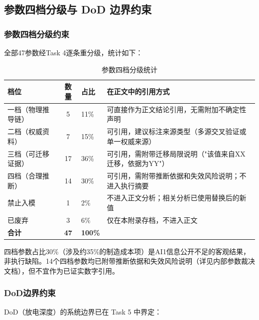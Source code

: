 \subsection{参数四档分级与 DoD 边界约束}
\label{sec:dod-boundary}

\subsubsection{参数四档分级约束}

全部47参数经Task 4逐条重分级，统计如下：

\begin{table}[H]
  \centering
  \caption{参数四档分级统计}
  \label{tab:param-tier-boundary}
  \begin{tabular}{lclp{6cm}}
  \toprule
  \textbf{档位} & \textbf{数量} & \textbf{占比} & \textbf{在正文中的引用方式} \\
  \midrule
  一档（物理推导链） & 5 & 11\% & 可直接作为正文结论引用，无需附加不确定性声明 \\
  二档（权威资料） & 7 & 15\% & 可引用，建议标注来源类型（多源交叉验证或单一权威来源） \\
  三档（可迁移证据） & 17 & 36\% & 可引用，需附带迁移局限说明（"该值来自XX迁移，依据为YY"） \\
  四档（合理推断） & 14 & 30\% & 可引用，需附带推断依据和失效风险说明；不进入执行摘要 \\
  禁止入模 & 1 & 2\% & 不进入正文分析；相关分析已使用替换后的新值 \\
  已废弃 & 3 & 6\% & 仅在本附录存档，不进入正文 \\
  \midrule
  \textbf{合计} & \textbf{47} & \textbf{100\%} & \\
  \bottomrule
  \end{tabular}
\end{table}

四档参数占比30\%（涉及约35\%的制造成本项）是AI1信息公开不足的客观结果，非执行缺陷。14个四档参数均已附带推断依据和失效风险说明（详见内部参数裁决文档），但不宜作为已证实数字引用。

\subsubsection{DoD边界约束}

DoD（放电深度）的系统边界已在 Task 5 中界定：

